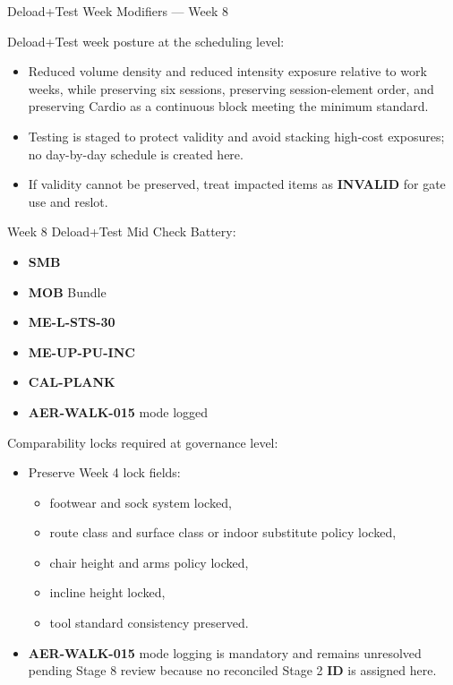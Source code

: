 \documentclass[10pt]{article}
\begin{document}
\begin{landscape}
Deload+Test Week Modifiers — Week 8\par\vspace{0.25em}

Deload+Test week posture at the scheduling level:

\begin{itemize}
\item Reduced volume density and reduced intensity exposure relative to work weeks, while preserving six sessions, preserving session-element order, and preserving Cardio as a continuous block meeting the minimum standard.
\item Testing is staged to protect validity and avoid stacking high-cost exposures; no day-by-day schedule is created here.
\item If validity cannot be preserved, treat impacted items as \textbf{INVALID} for gate use and reslot.
\end{itemize}

Week 8 Deload+Test Mid Check Battery:

\begin{itemize}
\item \textbf{SMB}
\item \textbf{MOB} Bundle
\item \textbf{ME-L-STS-30}
\item \textbf{ME-UP-PU-INC}
\item \textbf{CAL-PLANK}
\item \textbf{AER-WALK-015} mode logged
\end{itemize}

Comparability locks required at governance level:

\begin{itemize}
\item Preserve Week 4 lock fields:
\begin{itemize}
\item footwear and sock system locked,
\item route class and surface class or indoor substitute policy locked,
\item chair height and arms policy locked,
\item incline height locked,
\item tool standard consistency preserved.
\end{itemize}
\item \textbf{AER-WALK-015} mode logging is mandatory and remains unresolved pending Stage 8 review because no reconciled Stage 2 \textbf{ID} is assigned here.
\end{itemize}


\end{landscape}
\end{document}
